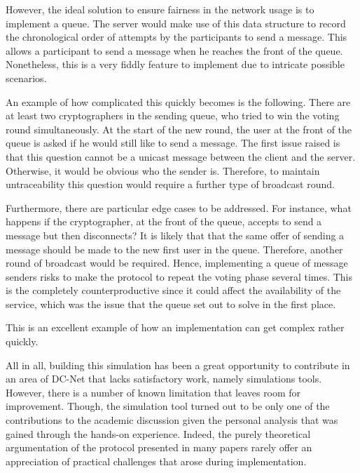 However, the ideal solution to ensure fairness in the network usage is to implement a queue. The server would make use of this data structure to record the chronological order of attempts by the participants to send a message. This allows a participant to send a message when he reaches the front of the queue. Nonetheless, this is a very fiddly feature to implement due to intricate possible scenarios. 


An example of how complicated this quickly becomes is the following. There are at least two cryptographers in the sending queue, who tried to win the voting round simultaneously. At the start of the new round, the user at the front of the queue is asked if he would still like to send a message. The first issue raised is that this question cannot be a unicast message between the client and the server. Otherwise, it would be obvious who the sender is. Therefore, to maintain untraceability this question would require a further type of broadcast round. 

Furthermore, there are particular edge cases to be addressed. For instance, what happens if the cryptographer, at the front of the queue, accepts to send a message but then disconnects? It is likely that that the same offer of sending a message should be made to the new first user in the queue. Therefore, another round of broadcast would be required. Hence, implementing a queue of message senders risks to make the protocol to repeat the voting phase several times. This is the completely counterproductive since it could affect the availability of the service, which was the issue that the queue set out to solve in the first place. 

This is an excellent example of how an implementation can get complex rather quickly. \newline


All in all, building this simulation has been a great opportunity to contribute in an area of DC-Net that lacks satisfactory work, namely simulations tools. However, there is a number of known limitation that leaves room for improvement. Though, the simulation tool turned out to be only one of the contributions to the academic discussion given the personal analysis that was gained through the hands-on experience. Indeed, the purely theoretical argumentation of the protocol presented in many papers rarely offer an appreciation of practical challenges that arose during implementation.
